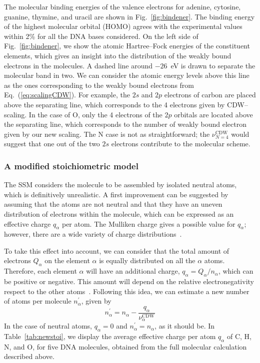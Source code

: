 \documentclass[10pt,showpacs,twocolumn]{revtex4}
\begin{document}
The molecular binding energies of the valence electrons for adenine, 
cytosine, guanine, thymine, and uracil are shown in Fig.~\ref{fig:bindener}. 
The binding energy of the highest molecular orbital (HOMO) agrees with 
the experimental values~\cite{Hush,Verkin,Dougherty} within 
2\% for all the DNA bases considered.
On the left side of Fig.~\ref{fig:bindener}, we show 
the atomic Hartree--Fock energies of the constituent elements, which 
gives an insight into the distribution of the weakly bound electrons
in the molecules. A dashed line around $-26$~eV is drawn to separate 
the molecular band in two. 
We can consider the atomic energy levels above this line as the ones
corresponding to the weakly bound electrons from Eq.~(\ref{eq:scalingCDW}).
For example, the $2s$ and $2p$ electrons of carbon are placed above
the separating line, which corresponds to the 4 electrons given by 
CDW--scaling. In the case of O, only the 4 electrons of 
the $2p$ orbitals are located above the separating line, which 
corresponds to the number of weakly bound electron given by 
our new scaling. 
The N case is not as straightforward; the $\nu_{N=4}^{\text{CDW}}$ 
would suggest that one out of the two $2s$ electrons contribute to the 
molecular scheme.

\subsubsection{A modified stoichiometric model}

The SSM considers the molecule to be assembled by isolated neutral atoms, 
which is definitively unrealistic. A first improvement can be suggested 
by assuming that the atoms are not neutral and that they have an uneven
distribution of electrons within the molecule, which can be expressed as 
an effective charge $q_{\alpha}$ per atom. The Mulliken charge gives a 
possible value for $q_{\alpha}$; however, there are a wide variety of 
charge distributions~\cite{lee2003}.

To take this effect into account, we can consider that the total amount 
of electrons $Q_{\alpha }$ on the element
$\alpha$ is equally distributed on all the $\alpha$ atoms. Therefore, 
each element $\alpha$ will have an additional charge, 
$q_{\alpha}=Q_{\alpha}/n_{\alpha}$, which can be positive or negative.
This amount will depend on the relative electronegativity respect to 
the other atoms~\cite{rappe1991}. 
Following this idea, we can estimate a new number of atoms per molecule
$n_{\alpha }^{\prime }$, given by
\begin{equation}
n_{\alpha }^{\prime }=n_{\alpha }-
\frac{q_{\alpha }}{\nu_{\alpha }^{\text{CDW}}}
\label{eq:newstoi}
\end{equation}%
In the case of neutral atoms, $q_{\alpha}=0$ and 
$n_{\alpha}^{\prime}=n_{\alpha}$, as it should be. 
In Table~\ref{tab:newstoi}, we display the average effective charge 
per atom $q_{\alpha}$ of C, H, N, and O, for five DNA molecules,
obtained from the full molecular calculation described 
above.
\end{document}
